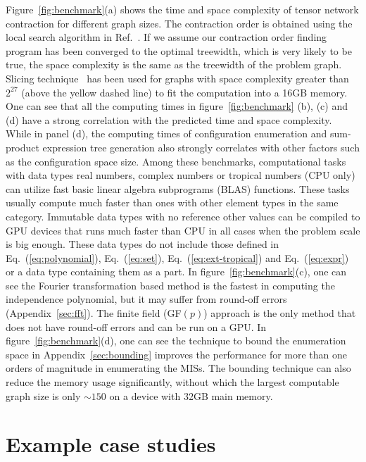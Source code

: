 \documentclass[onefignum, onetabnum]{siamart190516}
\newcommand{\<}{\langle}
\renewcommand{\>}{\rangle}
\newcommand{\Eq}[1]{Eq.~(\ref{#1})}
\newcommand{\App}[1]{Appendix~\ref{#1}}
\newcounter{example}
\begin{document}
Figure~\ref{fig:benchmark}(a) shows the time and space complexity of tensor network contraction for different graph sizes.
The contraction order is obtained using the local search algorithm in Ref.~\cite{Kalachev2021}.
If we assume our contraction order finding program has been converged to the optimal treewidth, which is very likely to be true, the space complexity is the same as the treewidth of the problem graph.
Slicing technique~\cite{Kalachev2021} has been used for graphs with space complexity greater than $2^{27}$ (above the yellow dashed line) to fit the computation into a 16GB memory.
One can see that all the computing times in figure~\ref{fig:benchmark} (b), (c) and (d) have a strong correlation with the predicted time and space complexity.
While in panel (d), the computing times of configuration enumeration and sum-product expression tree generation also strongly correlates with other factors such as the configuration space size.
Among these benchmarks, computational tasks with data types real numbers, complex numbers or tropical numbers (CPU only) can utilize fast basic linear algebra subprograms (BLAS) functions.
These tasks usually compute much faster than ones with other element types in the same category.
Immutable data types with no reference other values can be compiled to GPU devices that runs much faster than CPU in all cases when the problem scale is big enough.
These data types do not include those defined in \Eq{eq:polynomial}, \Eq{eq:set}, \Eq{eq:ext-tropical} and \Eq{eq:expr} or a data type containing them as a part.
In figure~\ref{fig:benchmark}(c), one can see the Fourier transformation based method is the fastest in computing the independence polynomial,
but it may suffer from round-off errors (\App{sec:fft}). The finite field (GF$(p)$) approach is the only method that does not have round-off errors and can be run on a GPU.
In figure~\ref{fig:benchmark}(d), one can see the technique to bound the enumeration space in \App{sec:bounding} improves the performance for more than one orders of magnitude in enumerating the MISs.
The bounding technique can also reduce the memory usage significantly, without which the largest computable graph size is only $\sim150$ on a device with 32GB main memory.

\section{Example case studies} \label{sec:examples}
\end{document}
